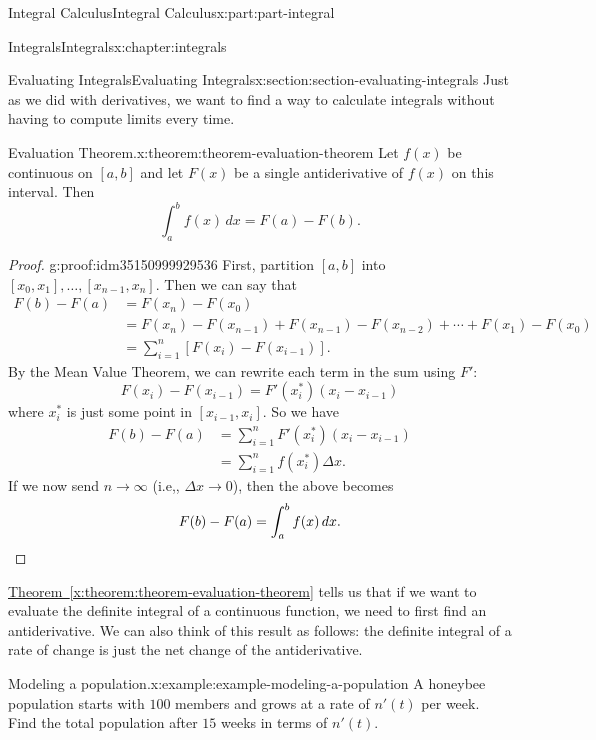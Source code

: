 \documentclass[twoside,10pt,]{book}
\newcommand{\xreffont}{\relax}
\numberwithin{equation}{part}
\newcommand{\qedhere}{\relax}
\begin{document}
\begin{partptx}{Integral Calculus}{}{Integral Calculus}{}{}{x:part:part-integral}
\begin{chapterptx}{Integrals}{}{Integrals}{}{}{x:chapter:integrals}
\begin{sectionptx}{Evaluating Integrals}{}{Evaluating Integrals}{}{}{x:section:section-evaluating-integrals}
Just as we did with derivatives, we want to find a way to calculate integrals without having to compute limits every time.%
\begin{theorem}{Evaluation Theorem.}{}{x:theorem:theorem-evaluation-theorem}%
Let \(f(x)\) be continuous on \([a,b]\) and let \(F(x)\) be a single antiderivative of \(f(x)\) on this interval. Then%
\begin{equation*}
\int_{a}^{b}f(x)\,dx = F(a) - F(b).
\end{equation*}
%
\end{theorem}
\begin{proof}{}{g:proof:idm35150999929536}
First, partition \([a,b]\) into \([x_{0},x_{1}],\ldots,[x_{n-1},x_{n}]\). Then we can say that%
\begin{align*}
F(b) - F(a) & = F(x_{n}) - F(x_{0}) \\
& = F(x_{n}) - F(x_{n-1}) + F(x_{n-1}) - F(x_{n-2}) + \cdots + F(x_{1}) - F(x_{0}) \\
& = \sum_{i=1}^{n}[F(x_{i}) - F(x_{i-1})]. 
\end{align*}
By the Mean Value Theorem, we can rewrite each term in the sum using \(F'\):%
\begin{equation*}
F(x_{i}) - F(x_{i-1}) = F'(x_{i}^{*})(x_{i} - x_{i-1})
\end{equation*}
where \(x_{i}^{*}\) is just some point in \([x_{i-1},x_{i}]\). So we have%
\begin{align*}
F(b) - F(a) & = \sum_{i=1}^{n}F'(x_{i}^{*})(x_{i} - x_{i-1}) \\
& = \sum_{i=1}^{n}f(x_{i}^{*})\Delta x. 
\end{align*}
If we now send \(n\to\infty\) (i.e,, \(\Delta x\to 0\)), then the above becomes%
\begin{equation*}
F(b) - F(a) = \int_{a}^{b}f(x)\,dx.\qedhere
\end{equation*}
%
\end{proof}
\hyperref[x:theorem:theorem-evaluation-theorem]{Theorem~{\xreffont\ref{x:theorem:theorem-evaluation-theorem}}} tells us that if we want to evaluate the definite integral of a continuous function, we need to first find an antiderivative. We can also think of this result as follows: the definite integral of a rate of change is just the net change of the antiderivative.%
\begin{example}{Modeling a population.}{x:example:example-modeling-a-population}%
A honeybee population starts with \(100\) members and grows at a rate of \(n'(t)\) per week. Find the total population after \(15\) weeks in terms of \(n'(t)\).%

\end{example}
\end{sectionptx}
\end{chapterptx}
\end{partptx}
\end{document}
